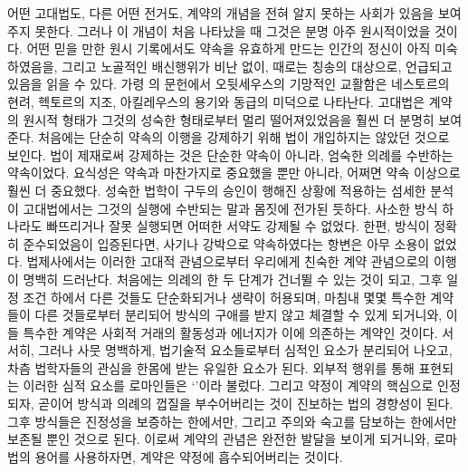 어떤 고대법도, 다른 어떤 전거도,
계약의 개념을 전혀 알지 못하는 사회가 있음을 보여주지 못한다.
그러나 이 개념이 처음 나타났을 때
그것은 분명 아주 원시적이었을 것이다.
어떤 믿을 만한 원시 기록에서도
약속을 유효하게 만드는 인간의 정신이 아직 미숙하였음을,
그리고
노골적인 배신행위가 비난 없이, 때로는 칭송의 대상으로, 언급되고 있음을
읽을  수 있다.
가령 의 문헌에서
오뒷세우스의 기망적인 교활함은
네스토르의 현려, 헥토르의 지조,
아킬레우스의 용기와 동급의 미덕으로 나타난다.
고대법은 계약의 원시적 형태가 그것의 성숙한 형태로부터
멀리 떨어져있었음을 훨씬 더 분명히 보여준다.
처음에는 단순히 약속의 이행을 강제하기 위해
법이 개입하지는 않았던 것으로 보인다.
법이 제재로써 강제하는 것은 단순한 약속이 아니라,
엄숙한 의례를 수반하는 약속이었다.
요식성은 약속과 마찬가지로 중요했을 뿐만 아니라,
어쩌면 약속 이상으로 훨씬 더 중요했다.
성숙한 법학이 구두의 승인이 행해진 상황에 적용하는
섬세한 분석이
고대법에서는
그것의 실행에 수반되는 말과 몸짓에 전가된 듯하다.
사소한 방식 하나라도 빠뜨리거나 잘못 실행되면 어떠한 서약도
강제될 수 없었다.
한편, 방식이 정확히 준수되었음이 입증된다면,
사기나 강박으로 약속하였다는 항변은 아무 소용이 없었다.
법제사에서는
이러한 고대적 관념으로부터 우리에게 친숙한 계약 관념으로의 이행이
명백히 드러난다.
처음에는 의례의 한 두 단계가 건너뛸 수 있는 것이 되고,
그후 일정 조건 하에서 다른 것들도 단순화되거나 생략이 허용되며,
마침내 몇몇 특수한 계약들이 다른 것들로부터 분리되어
방식의 구애를 받지 않고 체결할 수 있게 되거니와,
이들 특수한 계약은
사회적 거래의 활동성과 에너지가
이에
의존하는 계약인 것이다.
서서히, 그러나 사뭇 명백하게,
법기술적 요소들로부터 심적인 요소가 분리되어 나오고,
차츰 법학자들의 관심을 한몸에 받는 유일한 요소가 된다.
외부적 행위를 통해 표현되는
이러한 심적 요소를 로마인들은
`'이라 불렀다.
그리고 약정이 계약의 핵심으로 인정되자,
곧이어
방식과 의례의 껍질을 부수어버리는 것이
진보하는 법의 경향성이 된다.
그후 방식들은 진정성을 보증하는 한에서만,
그리고 주의와 숙고를 담보하는 한에서만
보존될 뿐인 것으로 된다.
이로써 계약의 관념은 완전한 발달을 보이게 되거니와,
로마법의 용어를 사용하자면,
계약은 약정에 흡수되어버리는 것이다.

